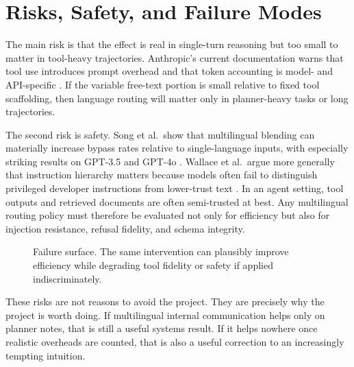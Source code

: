 \documentclass[11pt]{article}
\begin{document}
\section{Risks, Safety, and Failure Modes}

The main risk is that the effect is real in single-turn reasoning but too small to matter in tool-heavy trajectories. Anthropic's current documentation warns that tool use introduces prompt overhead and that token accounting is model- and API-specific \cite{anthropic2026tokencount,anthropic2026tooluse}. If the variable free-text portion is small relative to fixed tool scaffolding, then language routing will matter only in planner-heavy tasks or long trajectories.

The second risk is safety. Song et al.\ show that multilingual blending can materially increase bypass rates relative to single-language inputs, with especially striking results on GPT-3.5 and GPT-4o \cite{song2025multilingual}. Wallace et al.\ argue more generally that instruction hierarchy matters because models often fail to distinguish privileged developer instructions from lower-trust text \cite{wallace2024instruction}. In an agent setting, tool outputs and retrieved documents are often semi-trusted at best. Any multilingual routing policy must therefore be evaluated not only for efficiency but also for injection resistance, refusal fidelity, and schema integrity.

\begin{figure}[!htbp]
\centering
{}
\caption{Failure surface. The same intervention can plausibly improve efficiency while degrading tool fidelity or safety if applied indiscriminately.}
\label{fig:failure}
\end{figure}

These risks are not reasons to avoid the project. They are precisely why the project is worth doing. If multilingual internal communication helps only on planner notes, that is still a useful systems result. If it helps nowhere once realistic overheads are counted, that is also a useful correction to an increasingly tempting intuition.
\end{document}
